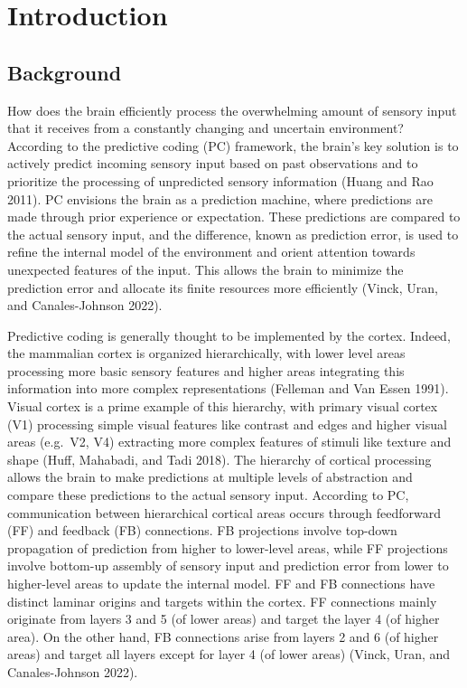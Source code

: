 \documentclass[
  letterpaper,
  DIV=11,
  numbers=noendperiod]{scrartcl}
\author{}
\date{}
\begin{document}
\section{Introduction}\label{introduction}

\subsection{Background}\label{background}

How does the brain efficiently process the overwhelming amount of
sensory input that it receives from a constantly changing and uncertain
environment? According to the predictive coding (PC) framework, the
brain's key solution is to actively predict incoming sensory input based
on past observations and to prioritize the processing of unpredicted
sensory information (Huang and Rao 2011). PC envisions the brain as a
prediction machine, where predictions are made through prior experience
or expectation. These predictions are compared to the actual sensory
input, and the difference, known as prediction error, is used to refine
the internal model of the environment and orient attention towards
unexpected features of the input. This allows the brain to minimize the
prediction error and allocate its finite resources more efficiently
(Vinck, Uran, and Canales-Johnson 2022).

Predictive coding is generally thought to be implemented by the cortex.
Indeed, the mammalian cortex is organized hierarchically, with lower
level areas processing more basic sensory features and higher areas
integrating this information into more complex representations (Felleman
and Van Essen 1991). Visual cortex is a prime example of this hierarchy,
with primary visual cortex (V1) processing simple visual features like
contrast and edges and higher visual areas (e.g.~V2, V4) extracting more
complex features of stimuli like texture and shape (Huff, Mahabadi, and
Tadi 2018). The hierarchy of cortical processing allows the brain to
make predictions at multiple levels of abstraction and compare these
predictions to the actual sensory input. According to PC, communication
between hierarchical cortical areas occurs through feedforward (FF) and
feedback (FB) connections. FB projections involve top-down propagation
of prediction from higher to lower-level areas, while FF projections
involve bottom-up assembly of sensory input and prediction error from
lower to higher-level areas to update the internal model. FF and FB
connections have distinct laminar origins and targets within the cortex.
FF connections mainly originate from layers 3 and 5 (of lower areas) and
target the layer 4 (of higher area). On the other hand, FB connections
arise from layers 2 and 6 (of higher areas) and target all layers except
for layer 4 (of lower areas) (Vinck, Uran, and Canales-Johnson 2022).
\end{document}
